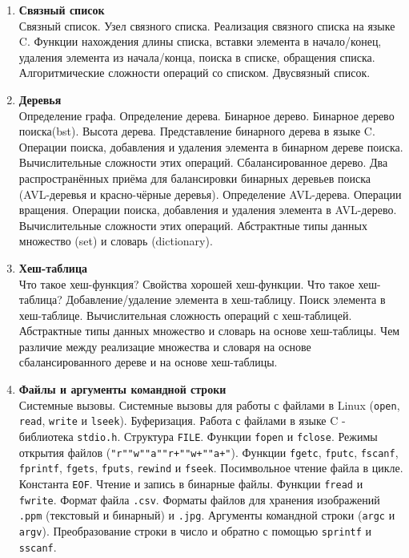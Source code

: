\documentclass{article}
\begin{document}
\begin{enumerate}
\item \textbf{Связный список}\\
Связный список. Узел связного списка. Реализация связного списка на языке C. Функции нахождения длины списка, вставки элемента в начало/конец, удаления элемента из начала/конца, поиска в списке, обращения списка. Алгоритмические сложности операций со списком. Двусвязный список.


\item \textbf{Деревья}\\
Определение графа. Определение дерева. Бинарное дерево. Бинарное дерево поиска(bst). Высота дерева. Представление бинарного дерева в языке C. Операции поиска, добавления и удаления элемента в бинарном дереве поиска. Вычислительные сложности этих операций. Сбалансированное дерево. Два распространённых приёма для балансировки бинарных деревьев поиска (AVL-деревья и красно-чёрные деревья). Определение AVL-дерева. Операции вращения. Операции поиска, добавления и удаления элемента в AVL-дерево. Вычислительные сложности этих операций. Абстрактные типы данных множество (set) и словарь (dictionary).


\item \textbf{Хеш-таблица}\\
Что такое хеш-функция? Свойства хорошей хеш-функции. Что такое хеш-таблица? Добавление/удаление элемента в хеш-таблицу. Поиск элемента в хеш-таблице. Вычислительная сложность операций с хеш-таблицей. Абстрактные типы данных множество и словарь на основе хеш-таблицы. Чем различие между реализацие множества и словаря на основе сбалансированного дереве и на основе хеш-таблицы.

\item \textbf{Файлы и аргументы командной строки}\\
Системные вызовы. Системные вызовы для работы с файлами в Linux (\texttt{open}, \texttt{read}, \texttt{write} и \texttt{lseek}). Буферизация. Работа с файлами в языке C - библиотека \texttt{stdio.h}. Структура \texttt{FILE}. Функции \texttt{fopen} и \texttt{fclose}. Режимы открытия файлов (\texttt{"r"\quad "w"\quad "a"\quad "r+"\quad "w+"\quad "a+"}). Функции \texttt{fgetc}, \texttt{fputc}, \texttt{fscanf}, \texttt{fprintf}, \texttt{fgets}, \texttt{fputs}, \texttt{rewind} и \texttt{fseek}. Посимвольное чтение файла в цикле. Константа \texttt{EOF}. Чтение и запись в бинарные файлы. Функции \texttt{fread} и \texttt{fwrite}. Формат файла \texttt{.csv}. Форматы файлов для хранения изображений \texttt{.ppm} (текстовый и бинарный) и \texttt{.jpg}. Аргументы командной строки (\texttt{argc} и \texttt{argv}). Преобразование строки в число и обратно с помощью \texttt{sprintf} и \texttt{sscanf}.



\end{enumerate}
\end{document}
